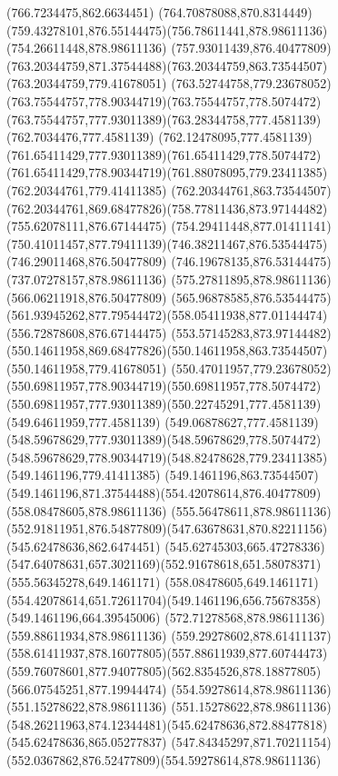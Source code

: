 {\lineto(766.7234475,862.6634451)
\curveto(764.70878088,870.8314449)(759.43278101,876.55144475)(756.78611441,878.98611136)
\lineto(754.26611448,878.98611136)
\curveto(757.93011439,876.40477809)(763.20344759,871.37544488)(763.20344759,863.73544507)
\lineto(763.20344759,779.41678051)
\curveto(763.52744758,779.23678052)(763.75544757,778.90344719)(763.75544757,778.5074472)
\curveto(763.75544757,777.93011389)(763.28344758,777.4581139)(762.7034476,777.4581139)
\curveto(762.12478095,777.4581139)(761.65411429,777.93011389)(761.65411429,778.5074472)
\curveto(761.65411429,778.90344719)(761.88078095,779.23411385)(762.20344761,779.41411385)
\lineto(762.20344761,863.73544507)
\curveto(762.20344761,869.68477826)(758.77811436,873.97144482)(755.62078111,876.67144475)
\curveto(754.29411448,877.01411141)(750.41011457,877.79411139)(746.38211467,876.53544475)
\lineto(746.29011468,876.50477809)
\lineto(746.19678135,876.53144475)
\lineto(737.07278157,878.98611136)
\lineto(575.27811895,878.98611136)
\lineto(566.06211918,876.50477809)
\lineto(565.96878585,876.53544475)
\curveto(561.93945262,877.79544472)(558.05411938,877.01144474)(556.72878608,876.67144475)
\curveto(553.57145283,873.97144482)(550.14611958,869.68477826)(550.14611958,863.73544507)
\lineto(550.14611958,779.41678051)
\curveto(550.47011957,779.23678052)(550.69811957,778.90344719)(550.69811957,778.5074472)
\curveto(550.69811957,777.93011389)(550.22745291,777.4581139)(549.64611959,777.4581139)
\curveto(549.06878627,777.4581139)(548.59678629,777.93011389)(548.59678629,778.5074472)
\curveto(548.59678629,778.90344719)(548.82478628,779.23411385)(549.1461196,779.41411385)
\lineto(549.1461196,863.73544507)
\curveto(549.1461196,871.37544488)(554.42078614,876.40477809)(558.08478605,878.98611136)
\lineto(555.56478611,878.98611136)
\curveto(552.91811951,876.54877809)(547.63678631,870.82211156)(545.62478636,862.6474451)
\lineto(545.62745303,665.47278336)
\curveto(547.64078631,657.3021169)(552.91678618,651.58078371)(555.56345278,649.1461171)
\lineto(558.08478605,649.1461171)
\curveto(554.42078614,651.72611704)(549.1461196,656.75678358)(549.1461196,664.39545006)
\moveto(572.71278568,878.98611136)
\lineto(559.88611934,878.98611136)
\curveto(559.29278602,878.61411137)(558.61411937,878.16077805)(557.88611939,877.60744473)
\curveto(559.76078601,877.94077805)(562.8354526,878.18877805)(566.07545251,877.19944474)
\closepath
\moveto(554.59278614,878.98611136)
\lineto(551.15278622,878.98611136)
\curveto(551.15278622,878.98611136)(548.26211963,874.12344481)(545.62478636,872.88477818)
\lineto(545.62478636,865.05277837)
\curveto(547.84345297,871.70211154)(552.0367862,876.52477809)(554.59278614,878.98611136)
}
